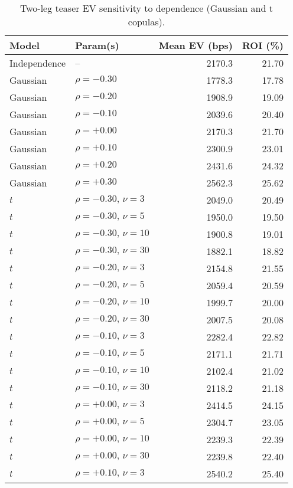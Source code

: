 \begin{table}[t]
  \centering
  \small
  \caption{Two-leg teaser EV sensitivity to dependence (Gaussian and t copulas).}
  \begin{tabular}{l l r r}
    \toprule
    Model & Param(s) & Mean EV (bps) & ROI (\%) \\
    \midrule
    Independence & -- & 2170.3 & 21.70 \\
    \midrule
    Gaussian & $\rho=-0.30$ & 1778.3 & 17.78 \\
    Gaussian & $\rho=-0.20$ & 1908.9 & 19.09 \\
    Gaussian & $\rho=-0.10$ & 2039.6 & 20.40 \\
    Gaussian & $\rho=+0.00$ & 2170.3 & 21.70 \\
    Gaussian & $\rho=+0.10$ & 2300.9 & 23.01 \\
    Gaussian & $\rho=+0.20$ & 2431.6 & 24.32 \\
    Gaussian & $\rho=+0.30$ & 2562.3 & 25.62 \\
    \midrule
    $t$ & $\rho=-0.30,\,\nu=3$ & 2049.0 & 20.49 \\
    $t$ & $\rho=-0.30,\,\nu=5$ & 1950.0 & 19.50 \\
    $t$ & $\rho=-0.30,\,\nu=10$ & 1900.8 & 19.01 \\
    $t$ & $\rho=-0.30,\,\nu=30$ & 1882.1 & 18.82 \\
    $t$ & $\rho=-0.20,\,\nu=3$ & 2154.8 & 21.55 \\
    $t$ & $\rho=-0.20,\,\nu=5$ & 2059.4 & 20.59 \\
    $t$ & $\rho=-0.20,\,\nu=10$ & 1999.7 & 20.00 \\
    $t$ & $\rho=-0.20,\,\nu=30$ & 2007.5 & 20.08 \\
    $t$ & $\rho=-0.10,\,\nu=3$ & 2282.4 & 22.82 \\
    $t$ & $\rho=-0.10,\,\nu=5$ & 2171.1 & 21.71 \\
    $t$ & $\rho=-0.10,\,\nu=10$ & 2102.4 & 21.02 \\
    $t$ & $\rho=-0.10,\,\nu=30$ & 2118.2 & 21.18 \\
    $t$ & $\rho=+0.00,\,\nu=3$ & 2414.5 & 24.15 \\
    $t$ & $\rho=+0.00,\,\nu=5$ & 2304.7 & 23.05 \\
    $t$ & $\rho=+0.00,\,\nu=10$ & 2239.3 & 22.39 \\
    $t$ & $\rho=+0.00,\,\nu=30$ & 2239.8 & 22.40 \\
    $t$ & $\rho=+0.10,\,\nu=3$ & 2540.2 & 25.40 \\

\end{tabular}
\end{table}
